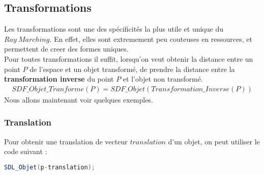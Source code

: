 \newpage
\subsection{Transformations}\label{subsec:Transformations}
Les transformations sont une des spécificités la plus utile et unique du $Ray\ Marching$. En effet, elles sont extremement peu couteuses en ressources, et permettent de creer des formes uniques.
\\Pour toutes transformations il suffit, lorsqu'on veut obtenir la distance entre un point $P$ de l'espace et un objet transformé, de prendre la distance entre la \textbf{transformation inverse} du point $P$ et l'objet non transformé.
\\
\begin{align*}
    SDF\_Objet\_Tranforme(P)=SDF\_Objet(Transformation\_Inverse(P))
\end{align*}
Nous allons maintenant voir quelques exemples.

\subsubsection{Translation}
Pour obtenir une translation de vecteur $translation$ d'un objet, on peut utiliser le code suivant :
\begin{lstlisting}[language=GLSL]
SDL_Objet(p-translation);
\end{lstlisting}

